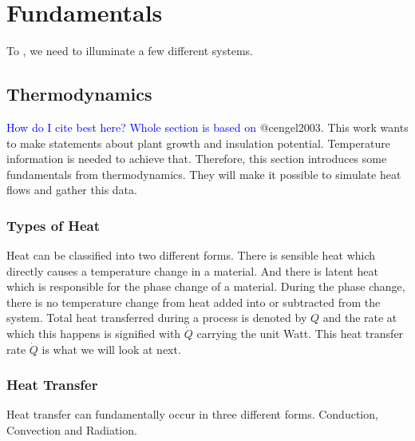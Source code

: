 \chapter{Fundamentals}
\label{chap:fundamentals}

To , we need to illuminate a few different systems.

\section{Thermodynamics}
\textcolor{Blue}{How do I cite best here? Whole section is based on} @cengel2003.
This work wants to make statements about plant growth and insulation potential.
Temperature information is needed to achieve that.
Therefore, this section introduces some fundamentals from thermodynamics.
They will make it possible to simulate heat flows and gather this data.



\subsection{Types of Heat}
Heat can be classified into two different forms.
There is sensible heat which directly causes a temperature change in a material.
And there is latent heat which is responsible for the phase change of a material.
During the phase change, there is no temperature change from heat added into or subtracted from the system.
Total heat transferred during a process is denoted by $Q$ and the rate at which this happens is signified with $\dot{Q}$ carrying the unit Watt.
This heat transfer rate $\dot{Q}$ is what we will look at next.

\subsection{Heat Transfer}
Heat transfer can fundamentally occur in three different forms.
Conduction, Convection and Radiation.


